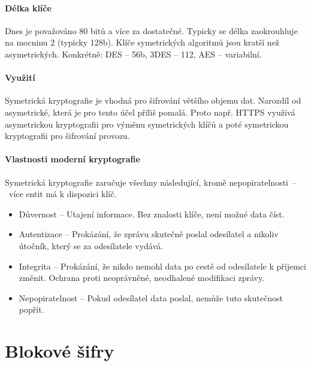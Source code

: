 \paragraph*{Délka klíče} Dnes je považováno 80 bitů a více za dostatečné. Typicky se délka zaokrouhluje na mocninu 2 (typicky 128b). Klíče symetrických algoritmů jsou kratší než asymetrických. Konkrétně: DES -- 56b, 3DES -- 112, AES -- variabilní.

\paragraph*{Využití} Symetrická kryptografie je vhodná pro šifrování většího objemu dat. Narozdíl od asymetrické, která je pro tento účel příliš pomalá. Proto např. HTTPS využívá asymetrickou kryptografii pro výměnu symetrických klíčů a poté symetrickou kryptografii pro šifrování provozu.

\paragraph*{Vlastnosti moderní kryptografie} Symetrická kryptografie zaručuje všechny následující, kromě nepopiratelnosti~--~více entit má k dispozici klíč. \begin{itemize}
    \item Důvernost -- Utajení informace. Bez znalosti klíče, není možné data číst.

    \item Autentizace -- Prokázání, že zprávu skutečně poslal odesílatel a nikoliv útočník, který se za odesílatele vydává.

    \item Integrita -- Prokázání, že nikdo nemohl data po cestě od odesílatele k příjemci změnit. Ochrana proti neoprávněné, neodhalené modifikaci zprávy.

    \item Nepopiratelnost -- Pokud odesílatel data poslal, nemůže tuto skutečnost popřít.
\end{itemize}


\section{Blokové šifry}

